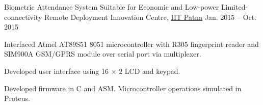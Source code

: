 
\begin{cvprojects}



\cvproject
	{Biometric Attendance System Suitable for Economic and Low-power Limited-connectivity Remote Deployment} %
	{} %
	{Innovation Centre, \href{https://www.iitp.ac.in}{IIT Patna}} %
	{Jan. 2015 -- Oct. 2015} %
	{\begin{cvitems} %
		\item {Interfaced Atmel AT89S51 8051 microcontroller with R305 fingerprint reader and SIM900A GSM/GPRS module over serial port via multiplexer.}
		\item {Developed user interface using 16 $\times$ 2 LCD and keypad.}
		\item {Developed firmware in C and ASM. Microcontroller operations simulated in Proteus.}
	\end{cvitems}}

\end{cvprojects}
